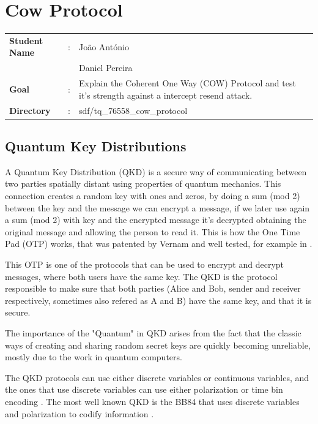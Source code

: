 \clearpage
\section{Cow Protocol}

\begin{refsection}

\begin{tcolorbox}	
\begin{tabular}{p{2.75cm} p{0.2cm} p{10.5cm}} 	
\textbf{Student Name}  &:&  Jo\~ao Ant\'onio\\
\textbf{}  & &  Daniel Pereira\\
\textbf{Goal}          &:& Explain the Coherent One Way (COW) Protocol and test it's strength against a intercept resend attack.\\
\textbf{Directory}     &:& sdf/tq\_76558\_cow\_protocol
\end{tabular}
\end{tcolorbox}

\subsection{Quantum Key Distributions}

A Quantum Key Distribution (QKD) is a secure way of communicating between two parties spatially distant using properties of quantum mechanics. This connection creates a random key with ones and zeros, by doing a sum (mod 2) between the key and the message we can encrypt a message, if we later use again a sum (mod 2) with key and the encrypted message it's decrypted obtaining the original message and allowing the person to read it. This is how the One Time Pad (OTP) works, that was patented by Vernam and well tested, for example in \cite{glover2005one}.

This OTP is one of the protocols that can be used to encrypt and decrypt messages, where both users have the same key. The QKD is the protocol responsible to make sure that both parties (Alice and Bob, sender and receiver respectively, sometimes also refered as A and B) have the same key, and that it is secure.

The importance of the "Quantum" in QKD arises from the fact that the classic ways of creating and sharing random secret keys are quickly becoming unreliable, mostly due to the work in quantum computers.

The QKD protocols can use either discrete variables or continuous variables, and the ones that use discrete variables can use either polarization or time bin encoding \cite{singh}. The most well known QKD is the BB84 that uses discrete variables and polarization to codify information \cite{bennett1984advances}.


\end{refsection}
